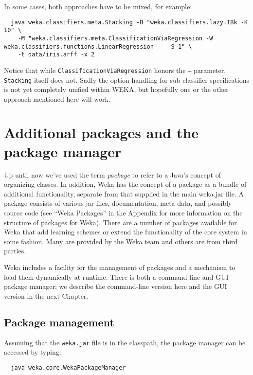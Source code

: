 \noindent In some cases, both approaches have to be mixed, for example:

{\scriptsize
\begin{verbatim}
  java weka.classifiers.meta.Stacking -B "weka.classifiers.lazy.IBk -K 10" \
    -M "weka.classifiers.meta.ClassificationViaRegression -W weka.classifiers.functions.LinearRegression -- -S 1" \
    -t data/iris.arff -x 2
\end{verbatim}}

\noindent Notice that while \texttt{ClassificationViaRegression} honors the \texttt{--} parameter, \texttt{Stacking} itself does not. Sadly the option handling for sub-classifier specifications is not yet completely unified within WEKA, but hopefully one or the other approach mentioned here will work. 

\section{Additional packages and the package manager}

Up until now we've used the term {\it package} to refer to a Java's
concept of organizing classes. In addition, Weka has the concept of a
package as a bundle of additional functionality, separate from that
supplied in the main weka.jar file. A package consists of various jar
files, documentation, meta data, and possibly source code (see ``Weka
Packages'' in the Appendix for more information on the structure of
packages for Weka). There are a number of packages available for Weka
that add learning schemes or extend the functionality of the core
system in some fashion. Many are provided by the Weka team and others
are from third parties.

Weka includes a facility for the management of packages and a
mechanism to load them dynamically at runtime. There is both a
command-line and GUI package manager; we describe the command-line
version here and the GUI version in the next Chapter.

\subsection{Package management}

Assuming that the \texttt{weka.jar} file is in the classpath, the
package manager can be accessed by typing:

{\scriptsize
\begin{verbatim}
  java weka.core.WekaPackageManager
\end{verbatim}}


